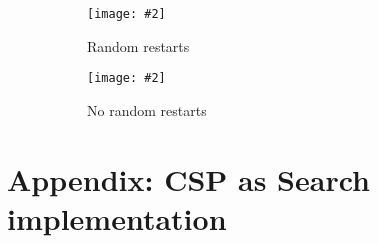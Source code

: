 \documentclass{article}
\newcommand{\centerfig}[2]{\begin{center}\texttt{[image: \#2]}\end{center}}
\begin{document}
\begin{enumerate}[label=(\alph*)]
\begin{center}
        \begin{figure}[htp]
        \begin{subfigure}[b]{0.5\textwidth} \color{ans}
            \centerfig{1}{../figs/q4_c_4.png}{
                \begin{center}
                    Random restarts
                \end{center}
            }
        \end{subfigure}
        \begin{subfigure}[b]{0.5\textwidth} \color{ans}
            \centerfig{1}{../figs/q4_c_5.png}{
                \begin{center}
                    No random restarts
                \end{center}
            }
        \end{subfigure}
        \end{figure}
    \end{center}
\end{enumerate}

\clearpage
\appendix

\section{Appendix: CSP as Search implementation}
\label{appendix:CSP Search}
\begin{center}
    
\end{center}
\end{document}
